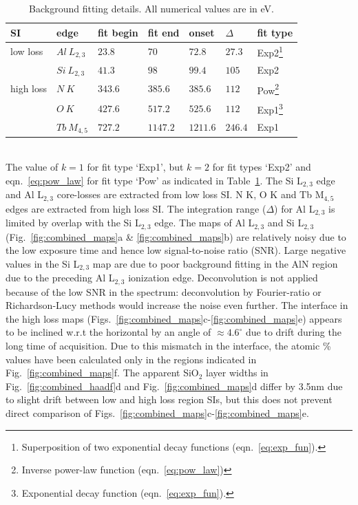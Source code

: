 \documentclass[%
aip,
rsi,%
 amsmath,amssymb,%
 reprint,%
]{revtex4-1}
\begin{document}
\begin{table}%
	\caption{Background fitting details. All numerical values are in eV.}
    \label{tab:back_fit_table}
    \begin{ruledtabular}
    	\begin{tabular}{lllllll}
    		SI	&edge	 &fit begin&fit end&onset&$\Delta$&fit type 	\\ \hline
            low loss&$Al~L_{2,3}$& $23.8$&$70$&$72.8$&$27.3$&Exp2\footnote{Superposition of two exponential decay functions (eqn.~\ref{eq:exp_fun}).} 		\\
            		&$Si~L_{2,3}$&$41.3$&$98$&$99.4$&$105$&Exp2 			\\ \hline
            high loss&$N~K$&$343.6$&$385.6$&$385.6$&$112$&Pow\footnote{Inverse power-law function (eqn.~\ref{eq:pow_law})} 			\\
                	&$O~K$&$427.6$&$517.2$&$525.6$&$112$&Exp1\footnote{Exponential decay function (eqn.~\ref{eq:exp_fun}).} 			\\
            		&$Tb~M_{4,5}$&$727.2$&$1147.2$&$1211.6$&$246.4$&Exp1 	\\
    	\end{tabular}
    \end{ruledtabular}
\end{table}\\
The value of $k = 1$ for fit type \lq{Exp1}\rq{}, but $k = 2$ for fit types \lq{Exp2}\rq{} and eqn.~\ref{eq:pow_law} for fit type \lq{Pow}\rq{} as indicated in Table~\ref{tab:back_fit_table}. The Si L$_{2,3}$ edge and Al L$_{2,3}$ core-losses are extracted from low loss SI. N K, O K and Tb M$_{4,5}$ edges are extracted from high loss SI. The integration range ($\Delta$) for Al L$_{2,3}$ is limited by overlap with the Si L$_{2,3}$ edge. The maps of Al L$_{2,3}$ and Si L$_{2,3}$ (Fig.~\ref{fig:combined_maps}a \& \ref{fig:combined_maps}b) are relatively noisy due to the low exposure time and hence low signal-to-noise ratio (SNR). Large negative values in the Si L$_{2,3}$ map are due to poor background fitting in the AlN region due to the preceding Al L$_{2,3}$ ionization edge. Deconvolution is not applied because of the low SNR in the spectrum: deconvolution by Fourier-ratio or Richardson-Lucy methods would increase the noise even further. The interface in the high loss maps (Figs.~\ref{fig:combined_maps}c-\ref{fig:combined_maps}e) appears to be inclined w.r.t the horizontal by an angle of $\approx4.6^\circ$ due to drift during the long time of acquisition. Due to this mismatch in the interface, the atomic \% values have been calculated only in the regions indicated in Fig.~\ref{fig:combined_maps}f. The apparent SiO$_2$ layer widths in Fig.~\ref{fig:combined_haadf}d and Fig.~\ref{fig:combined_maps}d differ by 3.5nm due to slight drift between low and high loss region SIs, but this does not prevent direct comparison of Figs.~\ref{fig:combined_maps}c-\ref{fig:combined_maps}e.
\end{document}
